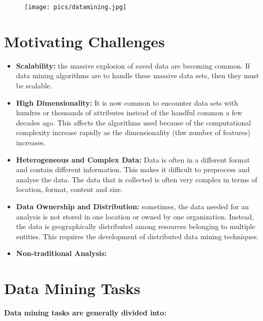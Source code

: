 		\begin{figure}[H]
			\texttt{[image: pics/datamining.jpg]}
		\end{figure}

\clearpage
\section{Motivating Challenges}

	\begin{itemize}
		\item {\bf Scalability:} the massive explosion of saved data are becoming common. If data mining 
		algorithms are to handle these massive data sets, then they must be scalable.
		\item {\bf High Dimensionality:} It is now common to encounter data sets with hundres or thousands 
		of attributes instead of the handful common a few decades ago. This affects the algorithms used 
		because of the computational complexity increase rapidly as the dimensionality (thw number of 
		features) increases.
		\item {\bf Heterogeneous and Complex Data:} Data is often in a different format and contain different
		information. This makes it difficult to preprocess and analyse the data. The data that is collected is
		often very complex in terms of location, format, content and size. 
		\item {\bf Data Ownership and Distribution:} sometimes, the data needed for an analysis is not 
		stored in one location or owned by one organization. Instead, the data is geographically distributed 
		among resources belonging to multiple entities. This requires the development of distributed
		data mining techniques. 
		\item {\bf Non-traditional Analysis:} 
	\end{itemize}

\clearpage
\section{Data Mining Tasks}
	
	{\bf Data mining tasks are generally divided into:}

